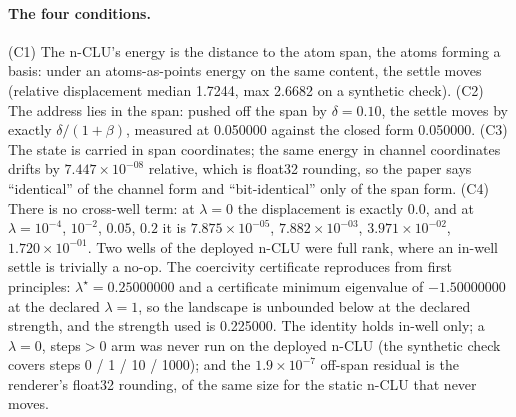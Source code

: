 \documentclass{article} %
\newcommand{\sci}[2]{\ensuremath{#1\times10^{#2}}}
\begin{document}
\paragraph{The four conditions.} (C1) The n-CLU's energy is the distance to the atom span, the
atoms forming a basis: under an atoms-as-points energy on the same content, the settle moves
(relative displacement median 1.7244, max 2.6682 on a synthetic check). (C2) The address lies in
the span: pushed off the span by $\delta=0.10$, the settle moves by exactly $\delta/(1+\beta)$,
measured at 0.050000 against the closed form 0.050000. (C3) The state is carried in span
coordinates; the same energy in channel coordinates drifts by \sci{7.447}{-08} relative, which is
float32 rounding, so the paper says ``identical'' of the channel form and ``bit-identical'' only
of the span form. (C4) There is no cross-well term: at $\lambda=0$ the displacement is exactly 0.0,
and at $\lambda=10^{-4}$, $10^{-2}$, $0.05$, $0.2$ it is \sci{7.875}{-05}, \sci{7.882}{-03},
\sci{3.971}{-02}, \sci{1.720}{-01}. Two wells of the deployed n-CLU were full rank, where an in-well
settle is trivially a no-op. The coercivity certificate reproduces from first principles:
$\lambda^\star=0.25000000$ and a certificate minimum eigenvalue of $-1.50000000$ at the declared
$\lambda=1$, so the landscape is unbounded below at the declared strength, and the strength used is
0.225000. %
The identity holds in-well only; a $\lambda=0$, steps$>0$ arm was never run on the deployed n-CLU
(the synthetic check covers steps 0 / 1 / 10 / 1000); and the \sci{1.9}{-7} off-span residual is the
renderer's float32 rounding, of the same size for the static n-CLU that never moves.
\end{document}
